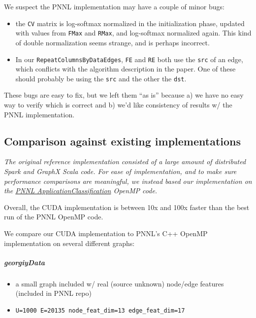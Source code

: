\documentclass[10pt,oneside]{memoir}
\providecommand{\tightlist}{%
  \setlength{\itemsep}{0pt}\setlength{\parskip}{0pt}}
\let\oldsubparagraph\subparagraph
\renewcommand{\subparagraph}[1]{\oldsubparagraph{#1}\mbox{}}
\begin{document}
We suspect the PNNL implementation may have a couple of minor bugs:

\begin{itemize}
\tightlist
\item
  the \texttt{CV} matrix is log-softmax normalized in the initialization
  phase, updated with values from \texttt{FMax} and \texttt{RMax}, and
  log-softmax normalized again. This kind of double normalization seems
  strange, and is perhaps incorrect.
\item
  In our \texttt{RepeatColumnsByDataEdges}, \texttt{FE} and \texttt{RE}
  both use the \texttt{src} of an edge, which conflicts with the
  algorithm description in the paper. One of these should probably be
  using the \texttt{src} and the other the \texttt{dst}.
\end{itemize}

These bugs are easy to fix, but we left them ``as is'' because a) we
have no easy way to verify which is correct and b) we'd like consistency
of results w/ the PNNL implementation.

\hypertarget{comparison-against-existing-implementations}{%
\subsection{Comparison against existing
implementations}\label{comparison-against-existing-implementations}}

\emph{The original reference implementation consisted of a large amount
of distributed Spark and GraphX Scala code. For ease of implementation,
and to make sure performance comparisons are meaningful, we instead
based our implementation on the
\href{https://gitlab.hiveprogram.com/pnnl/ApplicationClassification}{PNNL
ApplicationClassification} OpenMP code.}

Overall, the CUDA implementation is between 10x and 100x faster than the
best run of the PNNL OpenMP code.

We compare our CUDA implementation to PNNL's C++ OpenMP implementation
on several different graphs:

\hypertarget{georgiydata}{%
\subparagraph{georgiyData}\label{georgiydata}}

\begin{itemize}
\tightlist
\item
  a small graph included w/ real (source unknown) node/edge features
  (included in PNNL repo)
\item
  \texttt{\textbar{}U\textbar{}=1000\ \textbar{}E\textbar{}=20135\ node\_feat\_dim=13\ edge\_feat\_dim=17}
\end{itemize}
\end{document}
